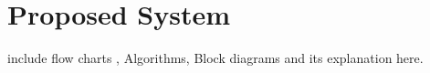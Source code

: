\chapter{Proposed System}
include flow charts , Algorithms, Block diagrams and its  explanation here.